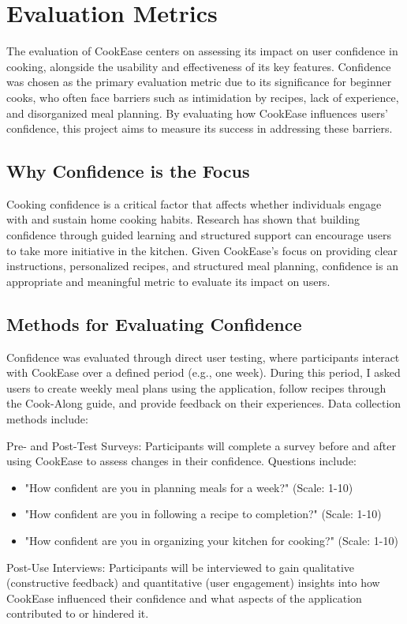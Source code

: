\documentclass[10pt,twocolumn]{article}
\begin{document}
\section{Evaluation Metrics}
The evaluation of CookEase centers on assessing its impact on user confidence in cooking, alongside the usability and effectiveness of its key features. Confidence was chosen as the primary evaluation metric due to its significance for beginner cooks, who often face barriers such as intimidation by recipes, lack of experience, and disorganized meal planning. By evaluating how CookEase influences users’ confidence, this project aims to measure its success in addressing these barriers.

\subsection{Why Confidence is the Focus}
Cooking confidence is a critical factor that affects whether individuals engage with and sustain home cooking habits. Research has shown that building confidence through guided learning and structured support can encourage users to take more initiative in the kitchen\cite{Farmer2021}. Given CookEase's focus on providing clear instructions, personalized recipes, and structured meal planning, confidence is an appropriate and meaningful metric to evaluate its impact on users.

\subsection{Methods for Evaluating Confidence}
Confidence was evaluated through direct user testing, where participants interact with CookEase over a defined period (e.g., one week). During this period, I asked users to create weekly meal plans using the application, follow recipes through the Cook-Along guide, and provide feedback on their experiences. Data collection methods include:

Pre- and Post-Test Surveys: Participants will complete a survey before and after using CookEase to assess changes in their confidence. Questions include:
\begin{itemize}
    \item "How confident are you in planning meals for a week?" (Scale: 1-10)
    \item "How confident are you in following a recipe to completion?" (Scale: 1-10)
    \item "How confident are you in organizing your kitchen for cooking?" (Scale: 1-10)
\end{itemize}
Post-Use Interviews: Participants will be interviewed to gain qualitative (constructive feedback) and quantitative (user engagement) insights into how CookEase influenced their confidence and what aspects of the application contributed to or hindered it.
\end{document}
